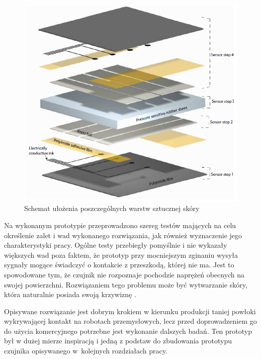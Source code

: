 \begin{figure}[!h]
    \centering 
    \includegraphics[width=0.4\linewidth]{img/przekroj_gietka.png}
    \caption{Schemat ułożenia poszczególnych warstw sztucznej skóry \cite{b_konf_gietka_przekroj}}
    \label{f_przeglad_gietka_przekroj}
\end{figure}



Na wykonanym prototypie przeprowadzono szereg testów mających na celu określenie zalet i wad wykonanego rozwiązania, jak również wyznaczenie jego charakterystyki pracy. Ogólne testy przebiegły pomyślnie i nie wykazały większych wad poza faktem, że prototyp przy mocniejszym zginaniu wysyła sygnały mogące świadczyć o kontakcie z przeszkodą, której nie ma. Jest to spowodowane tym, że czujnik nie rozpoznaje pochodzie naprężeń obecnych na swojej powierzchni. Rozwiązaniem tego problemu może być wytwarzanie skóry, która naturalnie posiada swoją krzywiznę \cite{b_konf_gietka_przekroj}.

Opisywane rozwiązanie jest dobrym krokiem w kierunku produkcji taniej powłoki wykrywającej kontakt na robotach przemysłowych, lecz przed doprowadzeniem go do użycia komercyjnego potrzebne jest wykonanie dalszych badań. Ten prototyp był w dużej mierze inspiracją i jedną z podstaw do zbudowania prototypu czujnika opisywanego w~kolejnych rozdziałach pracy.

